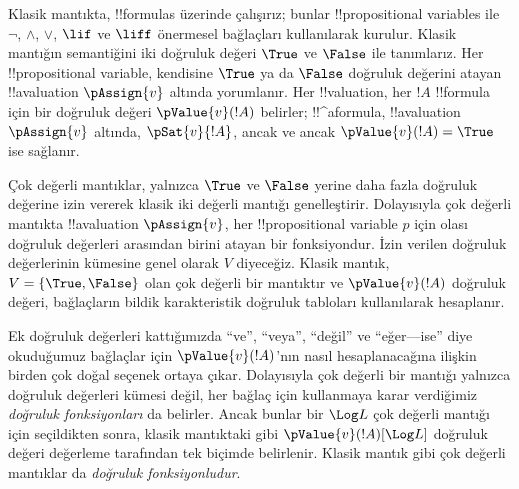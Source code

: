 



Klasik mantıkta, !!{formula}s üzerinde çalışırız; bunlar
!!{propositional variable}s ile $\lnot$, $\land$, $\lor$, $\lif$ ve $\liff$
önermesel bağlaçları kullanılarak kurulur. Klasik mantığın semantiğini iki
doğruluk değeri $\True$ ve $\False$ ile tanımlarız. Her
!!{propositional variable}, kendisine $\True$ ya da $\False$ doğruluk
değerini atayan !!a{valuation} $\pAssign{v}$ altında yorumlanır. Her
!!{valuation}, her $!A$ !!{formula} için bir doğruluk değeri
$\pValue{v}(!A)$ belirler; !!^a{formula}, !!a{valuation} $\pAssign{v}$
altında, $\pSat{v}{!A}$, ancak ve ancak $\pValue{v}(!A)=\True$ ise sağlanır.

Çok değerli mantıklar, yalnızca $\True$ ve $\False$ yerine daha fazla
doğruluk değerine izin vererek klasik iki değerli mantığı genelleştirir.
Dolayısıyla çok değerli mantıkta !!a{valuation} $\pAssign{v}$, her
!!{propositional variable} $p$ için olası doğruluk değerleri arasından birini
atayan bir fonksiyondur. İzin verilen doğruluk değerlerinin kümesine genel
olarak $V$ diyeceğiz. Klasik mantık, $V=\{\True,\False\}$ olan çok değerli
bir mantıktır ve $\pValue{v}(!A)$ doğruluk değeri, bağlaçların bildik
karakteristik doğruluk tabloları kullanılarak hesaplanır.

Ek doğruluk değerleri kattığımızda ``ve'', ``veya'', ``değil'' ve
``eğer---ise'' diye okuduğumuz bağlaçlar için $\pValue{v}(!A)$'nın nasıl
hesaplanacağına ilişkin birden çok doğal seçenek ortaya çıkar. Dolayısıyla
çok değerli bir mantığı yalnızca doğruluk değerleri kümesi değil, her bağlaç
için kullanmaya karar verdiğimiz \emph{doğruluk fonksiyonları} da belirler.
Ancak bunlar bir $\Log L$ çok değerli mantığı için seçildikten sonra,
klasik mantıktaki gibi $\pValue{v}(!A)[\Log L]$ doğruluk değeri değerleme
tarafından tek biçimde belirlenir. Klasik mantık gibi çok değerli mantıklar
da \emph{doğruluk fonksiyonludur}.

